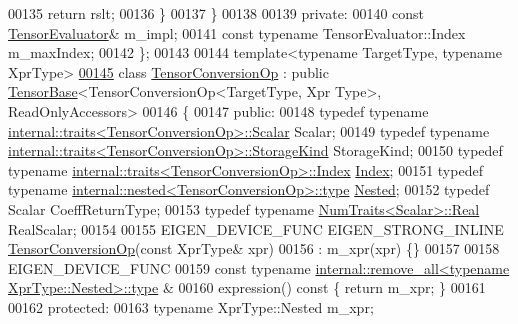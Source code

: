 \begin{DoxyCode}
00135       \textcolor{keywordflow}{return} rslt;
00136     \}
00137   \}
00138 
00139  \textcolor{keyword}{private}:
00140   \textcolor{keyword}{const} \hyperlink{struct_eigen_1_1_tensor_evaluator}{TensorEvaluator}& m\_impl;
00141   \textcolor{keyword}{const} \textcolor{keyword}{typename} TensorEvaluator::Index m\_maxIndex;
00142 \};
00143 
00144 \textcolor{keyword}{template}<\textcolor{keyword}{typename} TargetType, \textcolor{keyword}{typename} XprType>
\hyperlink{class_eigen_1_1_tensor_conversion_op}{00145} \textcolor{keyword}{class }\hyperlink{class_eigen_1_1_tensor_conversion_op}{TensorConversionOp} : \textcolor{keyword}{public} \hyperlink{class_eigen_1_1_tensor_base}{TensorBase}<TensorConversionOp<TargetType, Xpr
      Type>, ReadOnlyAccessors>
00146 \{
00147   \textcolor{keyword}{public}:
00148     \textcolor{keyword}{typedef} \textcolor{keyword}{typename} \hyperlink{struct_eigen_1_1internal_1_1traits}{internal::traits<TensorConversionOp>::Scalar}
       Scalar;
00149     \textcolor{keyword}{typedef} \textcolor{keyword}{typename} \hyperlink{struct_eigen_1_1internal_1_1traits}{internal::traits<TensorConversionOp>::StorageKind}
       StorageKind;
00150     \textcolor{keyword}{typedef} \textcolor{keyword}{typename} \hyperlink{struct_eigen_1_1internal_1_1traits}{internal::traits<TensorConversionOp>::Index}
       \hyperlink{namespace_eigen_a62e77e0933482dafde8fe197d9a2cfde}{Index};
00151     \textcolor{keyword}{typedef} \textcolor{keyword}{typename} \hyperlink{class_eigen_1_1internal_1_1_tensor_lazy_evaluator_writable}{internal::nested<TensorConversionOp>::type} 
      \hyperlink{class_eigen_1_1internal_1_1_tensor_lazy_evaluator_writable}{Nested};
00152     \textcolor{keyword}{typedef} Scalar CoeffReturnType;
00153     \textcolor{keyword}{typedef} \textcolor{keyword}{typename} \hyperlink{group___core___module_struct_eigen_1_1_num_traits}{NumTraits<Scalar>::Real} RealScalar;
00154 
00155     EIGEN\_DEVICE\_FUNC EIGEN\_STRONG\_INLINE \hyperlink{class_eigen_1_1_tensor_conversion_op}{TensorConversionOp}(\textcolor{keyword}{const} XprType& xpr)
00156         : m\_xpr(xpr) \{\}
00157 
00158     EIGEN\_DEVICE\_FUNC
00159     \textcolor{keyword}{const} \textcolor{keyword}{typename} \hyperlink{group___sparse_core___module}{internal::remove\_all<typename XprType::Nested>::type}
      &
00160     expression()\textcolor{keyword}{ const }\{ \textcolor{keywordflow}{return} m\_xpr; \}
00161 
00162   \textcolor{keyword}{protected}:
00163     \textcolor{keyword}{typename} XprType::Nested m\_xpr;

\end{DoxyCode}
